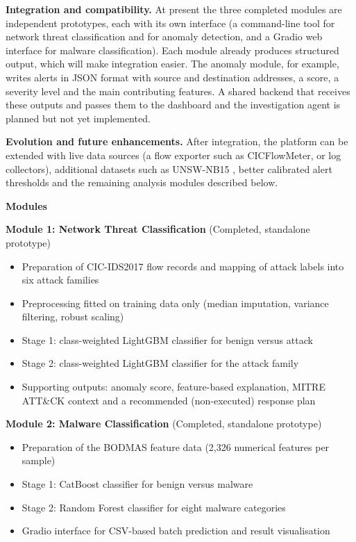 \textbf{Integration and compatibility.} At present the three completed modules are independent prototypes, each with its own interface (a command-line tool for network threat classification and for anomaly detection, and a Gradio web interface for malware classification). Each module already produces structured output, which will make integration easier. The anomaly module, for example, writes alerts in JSON format with source and destination addresses, a score, a severity level and the main contributing features. A shared backend that receives these outputs and passes them to the dashboard and the investigation agent is planned but not yet implemented.

\textbf{Evolution and future enhancements.} After integration, the platform can be extended with live data sources (a flow exporter such as CICFlowMeter, or log collectors), additional datasets such as UNSW-NB15 \cite{moustafa2015unsw}, better calibrated alert thresholds and the remaining analysis modules described below.

\textbf{Modules}

    \textbf{Module 1: Network Threat Classification} (Completed, standalone prototype)
    \begin{itemize}
      \setlength{\itemsep}{1pt}
      \setlength{\parskip}{0pt}
      \setlength{\parsep}{0pt}
      \item Preparation of CIC-IDS2017 flow records and mapping of attack labels into six attack families
      \item Preprocessing fitted on training data only (median imputation, variance filtering, robust scaling)
      \item Stage 1: class-weighted LightGBM classifier for benign versus attack
      \item Stage 2: class-weighted LightGBM classifier for the attack family
      \item Supporting outputs: anomaly score, feature-based explanation, MITRE ATT\&CK context and a recommended (non-executed) response plan
    \end{itemize}

    \textbf{Module 2: Malware Classification} (Completed, standalone prototype)
    \begin{itemize}
      \setlength{\itemsep}{1pt}
      \setlength{\parskip}{0pt}
      \setlength{\parsep}{0pt}
      \item Preparation of the BODMAS feature data (2,326 numerical features per sample)
      \item Stage 1: CatBoost classifier for benign versus malware
      \item Stage 2: Random Forest classifier for eight malware categories
      \item Gradio interface for CSV-based batch prediction and result visualisation
    \end{itemize}


